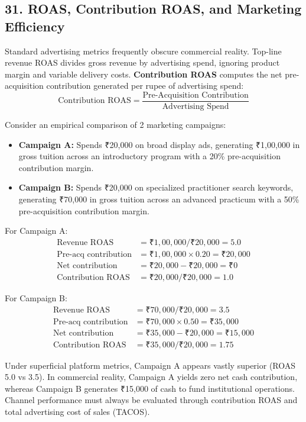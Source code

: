 \subsection*{31. ROAS, Contribution ROAS, and Marketing Efficiency}

Standard advertising metrics frequently obscure commercial reality. Top-line revenue ROAS divides gross revenue by advertising spend, ignoring product margin and variable delivery costs. \textbf{Contribution ROAS} computes the net pre-acquisition contribution generated per rupee of advertising spend:
\begin{equation}
  \text{Contribution ROAS} = \frac{\text{Pre-Acquisition Contribution}}{\text{Advertising Spend}}
\end{equation}

Consider an empirical comparison of 2 marketing campaigns:
\begin{itemize}[leftmargin=*,itemsep=1pt]
  \item \textbf{Campaign A:} Spends ₹20,000 on broad display ads, generating ₹1,00,000 in gross tuition across an introductory program with a 20\% pre-acquisition contribution margin.
  \item \textbf{Campaign B:} Spends ₹20,000 on specialized practitioner search keywords, generating ₹70,000 in gross tuition across an advanced practicum with a 50\% pre-acquisition contribution margin.
\end{itemize}

For Campaign A:
\begin{align*}
  \text{Revenue ROAS} &= \text{₹}1,00,000 / \text{₹}20,000 = 5.0 \\
  \text{Pre-acq contribution} &= \text{₹}1,00,000 \times 0.20 = \text{₹}20,000 \\
  \text{Net contribution} &= \text{₹}20,000 - \text{₹}20,000 = \text{₹}0 \\
  \text{Contribution ROAS} &= \text{₹}20,000 / \text{₹}20,000 = 1.0
\end{align*}

For Campaign B:
\begin{align*}
  \text{Revenue ROAS} &= \text{₹}70,000 / \text{₹}20,000 = 3.5 \\
  \text{Pre-acq contribution} &= \text{₹}70,000 \times 0.50 = \text{₹}35,000 \\
  \text{Net contribution} &= \text{₹}35,000 - \text{₹}20,000 = \text{₹}15,000 \\
  \text{Contribution ROAS} &= \text{₹}35,000 / \text{₹}20,000 = 1.75
\end{align*}

Under superficial platform metrics, Campaign A appears vastly superior (ROAS 5.0 vs 3.5). In commercial reality, Campaign A yields zero net cash contribution, whereas Campaign B generates ₹15,000 of cash to fund institutional operations. Channel performance must always be evaluated through contribution ROAS and total advertising cost of sales (TACOS).

